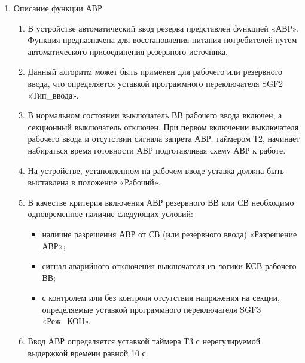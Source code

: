 
\color{black}

\begin{enumerate}

\item Описание функции АВР

\begin{enumerate}

\item
В устройстве автоматический ввод резерва представлен функцией «АВР». Функция  предназначена  для  восстановления  питания  потребителей  путем  автоматического присоединения резервного источника.

\item
Данный алгоритм может быть применен для рабочего или резервного ввода, что определяется уставкой программного переключателя SGF2 «Тип\_ввода».

\item
В  нормальном  состоянии  выключатель  ВВ  рабочего  ввода  включен,  а  секционный  выключатель отключен.  При  первом  включении  выключателя  рабочего  ввода  и  отсутствии  сигнала  запрета  АВР, таймером Т2, начинает набираться время готовности АВР подготавливая схему АВР к работе.

\item
На  устройстве, установленном  на  рабочем  вводе  уставка  должна  быть  выставлена  в  положение «Рабочий». 

\item
В  качестве критерия включения  АВР резервного ВВ  или  СВ  необходимо  одновременное  наличие следующих условий:
\begin{itemize} 
    \item наличие разрешения АВР от СВ (или резервного ввода) «Разрешение АВР»; 
    \item сигнал аварийного отключения выключателя из логики КСВ рабочего ВВ; 
    \item с контролем или без контроля отсутствия напряжения на секции, определяемые уставкой программного переключателя SGF3 «Реж\_КОН». 
\end{itemize}

\item
Ввод АВР определяется уставкой таймера Т3 с нерегулируемой выдержкой времени равной 10 с. 


\end{enumerate}
\end{enumerate}
